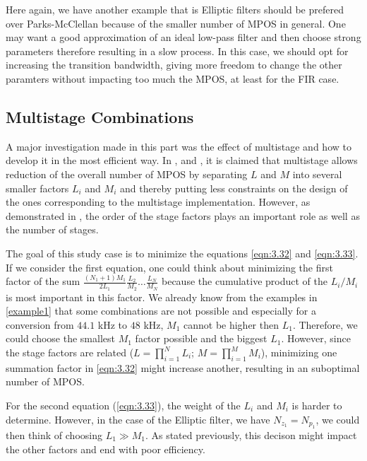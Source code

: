 Here again, we have another example that is Elliptic filters should be prefered over Parks-McClellan because of the smaller number of MPOS in general. One may want a good approximation of an ideal low-pass filter 	and then choose strong parameters therefore resulting in a slow process. In this case, we should opt for increasing the transition bandwidth, giving more freedom to change the other paramters without impacting too much the MPOS, at least for the FIR case.   


\subsection{Multistage Combinations}\label{section 3.2.2}
A major investigation made in this part was the effect of multistage and how to develop it in the most efficient way. In \cite{Proakis}, \cite{vaidyanathan} and \cite{Oppenheim}, it is claimed that multistage allows reduction of the overall number of MPOS by separating $L$ and $M$ into several smaller factors $L_i$ and $M_i$ and thereby putting less constraints on the design of the ones corresponding to the multistage implementation. However, as demonstrated in \cite{turek}, the order of the stage factors plays an important role as well as the number of stages. 

The goal of this study case is to minimize the equations \ref{eqn:3.32} and \ref{eqn:3.33}. If we consider the first equation, one could think about minimizing the first factor of the sum $\frac{(N_1 + 1)M_1}{2L_1} \frac{L_2}{M_2}\dots\frac{L_N}{M_N}$  because the cumulative product of the $L_i/M_i$ is most important in this factor. We already know from the examples in \ref{example1} that some combinations are not possible and especially for a conversion from $44.1$ kHz to $48$ kHz, $M_1$ cannot be higher then $L_1$. Therefore, we could choose the smallest $M_1$ factor possible and the biggest $L_1$. However, since the stage factors are related ($L = \prod_{i=1}^{N}L_i$; $M = \prod_{i=1}^{M}M_i$), minimizing one summation factor in \ref{eqn:3.32} might increase another, resulting in an suboptimal number of MPOS. 

For the second equation (\ref{eqn:3.33}), the weight of the $L_i$ and $M_i$ is harder to determine. However, in the case of the Elliptic filter, we have $N_{z_1} = N_{p_1}$, we could then think of choosing $L_1 \gg M_1$. As stated previously, this decison might impact the other factors and end with poor efficiency.\\

